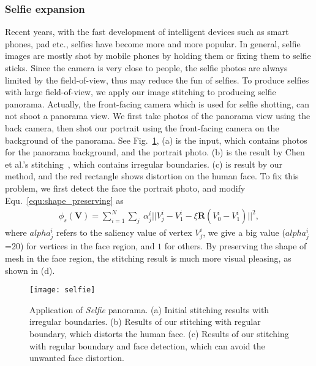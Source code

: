\documentclass[10pt,journal,compsoc]{IEEEtran}
\begin{document}
 \subsubsection{Selfie expansion}

Recent years, with the fast development of intelligent devices such as smart phones, pad etc., selfies have become more and more popular.
In general, selfie images are mostly shot by mobile phones by holding them or fixing them to selfie sticks.
Since the camera is very close to people, the selfie photos are always limited by the field-of-view, thus may reduce the fun of selfies.
To produce selfies with large field-of-view, we apply our image stitching to producing selfie panorama.
Actually, the front-facing camera which is used for selfie shotting, can not shoot a panorama view.
We first take photos of the panorama view using the back camera, then shot our portrait using the front-facing camera on the background of the panorama.
See Fig.~\ref{fig:selfie}, (a) is the input, which contains photos for the panorama background, and the portrait photo.
(b) is the result by Chen et al.'s stitching~\cite{conf/eccv/ChenC16}, which contains irregular boundaries.
(c) is result by our method, and the red rectangle shows distortion on the human face.
To fix this problem, we first detect the face the portrait photo, and modify Equ.~\ref{equ:shape_preserving} as
\begin{equation} \label{equ:shape_preserving1}
\begin{split}
    \phi_s(\mathbf{V}) = \sum\limits_{i=1}^N\sum\limits_{j} \
    \alpha_j^i||V_j^i -V_1^i-\xi \mathbf{R}(V_0^i -V_1^i)||^2,
\end{split}
\end{equation}
where $alpha_j^i$ refers to the saliency value of vertex $V_j^i $, we give a big value ($alpha_j^i$=20) for vertices in the face region, and $1$ for others.
By preserving the shape of  mesh in the face region, the stitching result is much more visual pleasing, as shown in (d).

 \begin{figure} %
  \centering
  \texttt{[image: selfie]}
  \caption{Application of \emph{Selfie} panorama. (a) Initial stitching results with irregular boundaries. (b) Results of our stitching with regular boundary, which distorts the human face. (c) Results of our stitching with regular boundary and face detection, which can avoid the unwanted face distortion. } \label{fig:selfie}
\end{figure}
\end{document}
